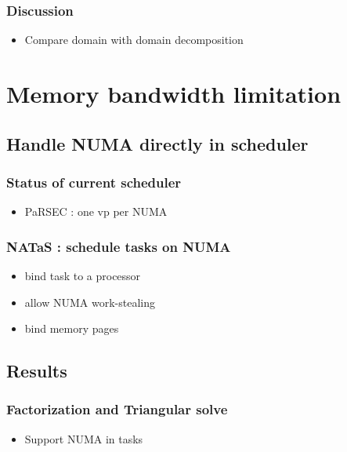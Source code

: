 \documentclass[oneside,12t]{classes/Thesis}
\begin{document}
\subsection{Discussion}
  \begin{itemize}
    \item Compare domain with domain decomposition
  \end{itemize}





\chapter{Memory bandwidth limitation}
\minitoc
\vspace{1cm}



\section{Handle NUMA directly in scheduler}
\subsection{Status of current scheduler}
  \begin{itemize}
    \item PaRSEC : one vp per NUMA
  \end{itemize}
\subsection{NATaS : schedule tasks on NUMA}
  \begin{itemize}
    \item bind task to a processor
    \item allow NUMA work-stealing
    \item bind memory pages
  \end{itemize}


\section{Results}
\subsection{Factorization and Triangular solve}
  \begin{itemize}
    \item Support NUMA in tasks
  \end{itemize}
\end{document}
